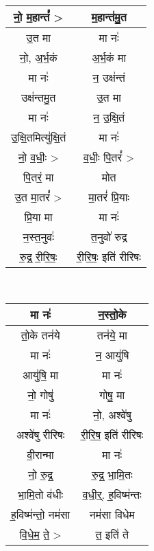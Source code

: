 {\centering
{\small {}} \\
\begin{longtable}{|c|c|}
\hline
नो॒ म॒हान्तं᳚ >                   & म॒हान्त॑मु॒त\\
\hline
उ॒त मा                        & मा नः॑\\
\hline
नो॒, अ॒र्भ॒कं                      & अ॒र्भ॒कं मा\\
\hline
मा नः॑                        & न॒ उक्ष॑न्तं\\
\hline
उक्ष॑न्तमु॒त                      & उ॒त मा\\
\hline
मा नः॑                        & न॒ उ॒क्षि॒तं\\
\hline
उ॒क्षि॒तमित्यु॑क्षि॒तं                & मा नः॑\\
\hline
नो॒ व॒धीः॒ >                    & व॒धीः॒ पि॒तरं᳚ >\\
\hline
पि॒तरं॒ मा                      & मोत\\
\hline
उ॒त मा॒तरं᳚ >                    & मा॒तरं॑ प्रि॒याः\\
\hline
प्रि॒या मा                     & मा नः॑\\
\hline
न॒स्त॒नुवः॑                       & त॒नुवो॑ रुद्र\\
\hline
रु॒द्र॒ री॒रि॒षः॒                   & री॒रि॒षः॒ इति॑ रीरिषः\\
\hline
\end{longtable}
}
{\centering
{\small {}} \\
\begin{longtable}{|c|c|}
\hline
मा नः॑                        & न॒स्तो॒के\\
\hline
तो॒के तन॑ये                      & तन॑ये॒ मा\\
\hline
मा नः॑                        & न॒ आयु॑षि\\
\hline
आयु॑षि॒ मा                      & मा नः॑\\
\hline
नो॒ गोषु॑                       & गोषु॒ मा\\
\hline
मा नः॑                        & नो॒, अश्वे॑षु\\
\hline
अश्वे॑षु रीरिषः                  & री॒रि॒ष॒ इति॑ रीरिषः\\
\hline
वी॒रान्मा                      & मा नः॑\\
\hline
नो॒ रु॒द्र॒                       & रु॒द्र॒ भा॒मि॒तः\\
\hline
भा॒मि॒तो व॑धीः                  & व॒धी॒र्॒. ह॒विष्म॑न्तः\\
\hline
ह॒विष्म॑न्तो॒ नम॑सा                & नम॑सा विधेम\\
\hline
वि॒धे॒म॒ ते॒ >                     & त॒ इति॑ ते\\
\hline
\end{longtable}
}
